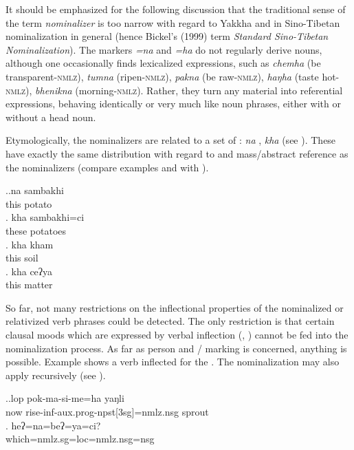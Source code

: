 It should be emphasized for the following discussion that the traditional sense of the term \emph{nominalizer} is too narrow with regard to Yakkha and in Sino-Tibetan nominalization in general (hence Bickel's (1999) term \emph{Standard Sino-Tibetan Nominalization}).  The markers \emph{=na} and \emph{=ha} do not regularly derive nouns, although one occasionally finds lexicalized expressions, such as \emph{chemha}  (be transparent-\textsc{nmlz}),  \emph{tumna}  (ripen-\textsc{nmlz}), \emph{pakna}  (be raw-\textsc{nmlz}), \emph{haŋha}  (taste hot-\textsc{nmlz}), \emph{bhenikna}  (morning-\textsc{nmlz}). Rather, they  turn any material into referential expressions, behaving identically or very much like noun phrases, either with or without a head noun. 


Etymologically, the nominalizers are related to a set of : \emph{na} , \emph{kha}  (see ). These  have exactly the same distribution with regard to  and mass/abstract reference as the nominalizers (compare examples \LLast and \Last with \Next).


\ex.\ag.na sambakhi\\
this potato\\
\bg. kha sambakhi=ci\\
these potatoes\\
\bg. kha kham\\
this soil\\
\bg. kha ceʔya\\
this matter\\


		 
So far, not many restrictions on the inflectional properties of the nominalized or relativized verb phrases could be detected. The only restriction is that certain clausal moods which are expressed by verbal inflection (, ) cannot be fed into the nominalization process. As far as person and / marking is concerned, anything is possible. Example \Next[a] shows a verb inflected for the . The nominalization may also apply recursively (see \Next[b]).


 \ex.\ag.lop pok-ma-si-me=ha yaŋli\\
 now rise-{\sc inf-aux.prog-npst[3sg]=nmlz.nsg} sprout\\
\bg.  	heʔ=na=beʔ=ya=ci?\\
		which{\sc =nmlz.sg=loc=nmlz.nsg=nsg}\\

